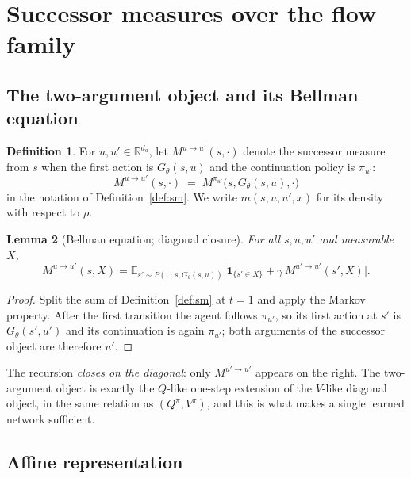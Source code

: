 \documentclass[11pt]{article}
\theoremstyle{plain}
\newtheorem{lemma}{Lemma}[section]
\theoremstyle{definition}
\newtheorem{definition}[lemma]{Definition}
\theoremstyle{remark}
\newcommand{\R}{\mathbb R}
\newcommand{\E}{\mathbb E}
\newcommand{\1}{\mathbf 1}
\newcommand{\Gth}{G_\theta}
\begin{document}
\section{Successor measures over the flow family}
\label{sec:sm}

\subsection{The two-argument object and its Bellman equation}

\begin{definition}
\label{def:Muu}
For $u,u'\in\R^{d_a}$, let $M^{u\to u'}(s,\cdot)$ denote the successor measure from $s$
when the first action is $\Gth(s,u)$ and the continuation policy is $\pi_{u'}$:
\[
  M^{u\to u'}(s,\cdot)\;=\;M^{\pi_{u'}}\big(s,\Gth(s,u),\cdot\big)
\]
in the notation of Definition~\ref{def:sm}. We write $m(s,u,u',x)$ for its density with
respect to $\rho$.
\end{definition}

\begin{lemma}[Bellman equation; diagonal closure]
\label{lem:bellman}
For all $s,u,u'$ and measurable $X$,
\begin{equation}
\label{eq:bellman}
  M^{u\to u'}(s,X)=\E_{s'\sim P(\cdot\mid s,\Gth(s,u))}
  \Big[\1_{\{s'\in X\}}+\gamma\,M^{u'\to u'}(s',X)\Big].
\end{equation}
\end{lemma}

\begin{proof}
Split the sum of Definition~\ref{def:sm} at $t=1$ and apply the Markov property. After the
first transition the agent follows $\pi_{u'}$, so its first action at $s'$ is
$\Gth(s',u')$ and its continuation is again $\pi_{u'}$; both arguments of the successor
object are therefore $u'$.
\end{proof}

\noindent
The recursion \emph{closes on the diagonal}: only $M^{u'\to u'}$ appears on the right. The
two-argument object is exactly the $Q$-like one-step extension of the $V$-like diagonal
object, in the same relation as $(Q^\pi,V^\pi)$, and this is what makes a single learned
network sufficient.

\subsection{Affine representation}
\end{document}
